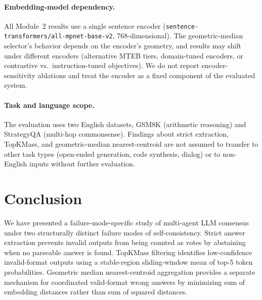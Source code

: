 \documentclass[11pt]{article}
\begin{document}
\paragraph{Embedding-model dependency.}
All Module~2 results use a single sentence encoder
(\texttt{sentence-transformers/all-mpnet-base-v2}, 768-dimensional). The
geometric-median selector's behavior depends on the encoder's geometry, and
results may shift under different encoders (alternative MTEB tiers,
domain-tuned encoders, or contrastive vs.\ instruction-tuned objectives). We
do not report encoder-sensitivity ablations and treat the encoder as a fixed
component of the evaluated system.

\paragraph{Task and language scope.}
The evaluation uses two English datasets, GSM8K (arithmetic reasoning) and
StrategyQA (multi-hop commonsense). Findings about strict extraction,
TopKMass, and geometric-median nearest-centroid are not assumed to transfer to
other task types (open-ended generation, code synthesis, dialog) or to
non-English inputs without further evaluation.

\section{Conclusion}
\label{sec:conclusion}

We have presented a failure-mode-specific study of multi-agent LLM consensus
under two structurally distinct failure modes of self-consistency. Strict answer
extraction prevents invalid outputs from being counted as votes by abstaining
when no parseable answer is found. TopKMass filtering identifies low-confidence
invalid-format outputs using a stable-region sliding-window mean of top-5 token
probabilities. Geometric median nearest-centroid aggregation provides a separate
mechanism for coordinated valid-format wrong answers by minimizing sum of
embedding distances rather than sum of squared distances.
\end{document}
